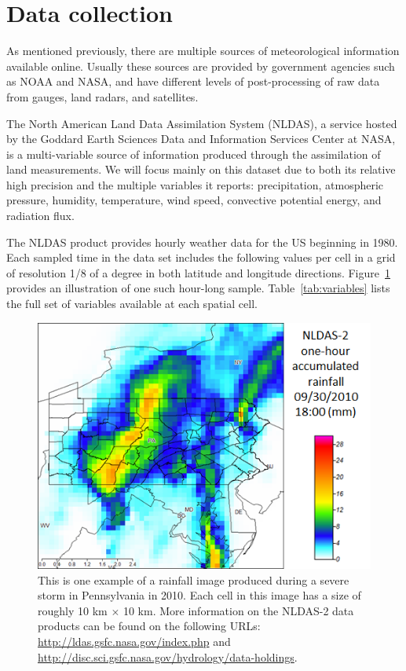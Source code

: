 \documentclass{article}
\begin{document}
\section{Data collection}

As mentioned previously, there are multiple sources of meteorological
information available online. Usually these sources are provided by government
agencies such as NOAA and NASA, and have different levels of post-processing of
raw data from gauges, land radars, and satellites.

The North American Land Data Assimilation System (NLDAS), a service hosted by
the Goddard Earth Sciences Data and Information Services Center at NASA, is a
multi-variable source of information produced through the assimilation of land
measurements. We will focus mainly on this dataset due to both its relative high
precision and the multiple variables it reports: precipitation, atmospheric
pressure, humidity, temperature, wind speed, convective potential energy, and
radiation flux.

The NLDAS product provides hourly weather data for the US beginning in 1980.
Each sampled time in the data set includes the following values per cell in a
grid of resolution 1/8 of a degree in both latitude and longitude directions.
Figure~\ref{fig:example_rainfall} provides an illustration of one such hour-long
sample. Table~\ref{tab:variables} lists the full set of variables available at
each spatial cell.

\begin{figure}[ht] \vskip 0.2in
\begin{center}
\centerline{\includegraphics[width=0.9\columnwidth]{images/weather.png}}
\caption{This is one example of a rainfall image produced during a severe storm in Pennsylvania in 2010. Each cell in this image has a size of roughly 10 km $\times$ 10 km. More information on the NLDAS-2 data products can be found on the following URLs: \url{http://ldas.gsfc.nasa.gov/index.php} and \url{http://disc.sci.gsfc.nasa.gov/hydrology/data-holdings}.}
\label{fig:example_rainfall}
\end{center}
\vskip -0.2in
\end{figure}
\end{document}
